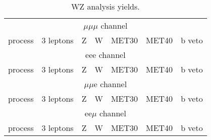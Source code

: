 \documentclass[a4paper]{article}
\begin{document}
\begin{table}[ht]
\begin{center}
\begin{tabular}{l|r|r|r|r|r|r}
\hline
\multicolumn{7}{c}{$\mu\mu\mu$ channel}\\
process & 3 leptons & Z & W & MET30 & MET40 & b veto\\
\hline

\hline
\hline
\multicolumn{7}{c}{eee channel}\\
process & 3 leptons & Z & W & MET30 & MET40 & b veto\\
\hline

\hline
\hline
\multicolumn{7}{c}{$\mu\mu$e channel}\\
process & 3 leptons & Z & W & MET30 & MET40 & b veto\\
\hline

\hline
\hline
\multicolumn{7}{c}{ee$\mu$ channel}\\
process & 3 leptons & Z & W & MET30 & MET40 & b veto\\
\hline

\hline
\end{tabular}
\caption{WZ analysis yields.}
\label{tab:wz_yields}
\end{center}
\end{table}
\end{document}
